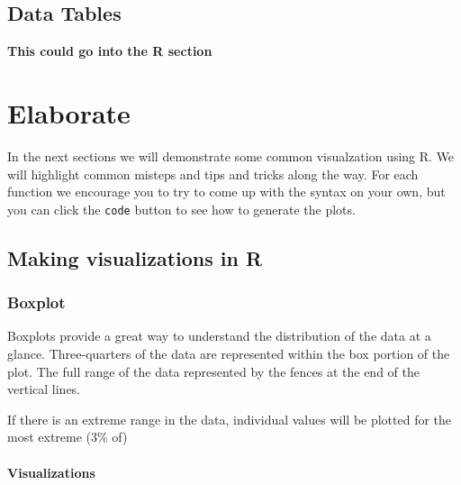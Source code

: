 \documentclass[
]{book}
\newenvironment{Shaded}{\begin{snugshade}}{\end{snugshade}}
\newcommand{\FunctionTok}[1]{\textcolor[rgb]{0.13,0.29,0.53}{\textbf{#1}}}
\newcommand{\NormalTok}[1]{#1}
\newcommand{\SpecialCharTok}[1]{\textcolor[rgb]{0.81,0.36,0.00}{\textbf{#1}}}
\begin{document}
\hypertarget{data-tables}{%
\subsection{Data Tables}\label{data-tables}}

\textbf{This could go into the R section}

\hypertarget{elaborate-1}{%
\section{Elaborate}\label{elaborate-1}}

In the next sections we will demonstrate some common visualzation using R. We will highlight common misteps and tips and tricks along the way. For each function we encourage you to try to come up with the syntax on your own, but you can click the \texttt{code} button to see how to generate the plots.

\hypertarget{making-visualizations-in-r}{%
\subsection{Making visualizations in R}\label{making-visualizations-in-r}}

\hypertarget{boxplot}{%
\subsubsection{Boxplot}\label{boxplot}}

Boxplots provide a great way to understand the distribution of the data at a glance. Three-quarters of the data are represented within the box portion of the plot. The full range of the data represented by the fences at the end of the vertical lines.

If there is an extreme range in the data, individual values will be plotted for the most extreme (3\% of)

\hypertarget{visualizations}{%
\paragraph{Visualizations}\label{visualizations}}

\begin{Shaded}
\end{Shaded}
\end{document}
